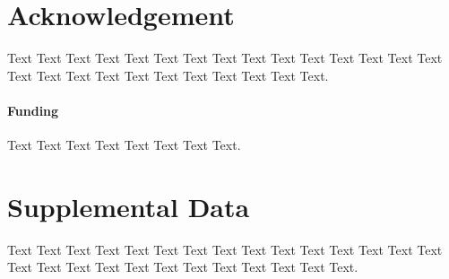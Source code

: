 \documentclass{frontiersSCNS} %
\begin{document}
\section*{Acknowledgement} Text Text Text Text Text Text  Text Text Text Text
Text Text Text Text  Text Text Text Text Text Text Text Text Text  Text Text
Text.

\paragraph{Funding\textcolon} Text Text Text Text Text Text  Text Text.

\section*{Supplemental Data} Text Text Text Text Text Text  Text Text Text Text
Text Text Text Text Text  Text Text Text Text Text Text Text Text Text  Text
Text Text.


\end{document}
